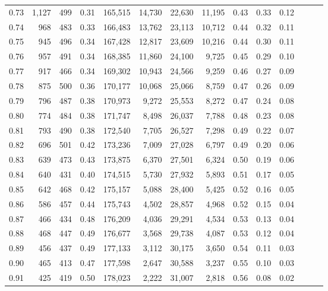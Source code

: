 \begin{tabular}{rrrrrrrrrrrrrr}
0.73 &  1,127 &  499 &  0.31 &  165,515 &   14,730 &  22,630 &  11,195 &  0.43 &  0.33 &      0.12 \\
0.74 &    968 &  483 &  0.33 &  166,483 &   13,762 &  23,113 &  10,712 &  0.44 &  0.32 &      0.11 \\
0.75 &    945 &  496 &  0.34 &  167,428 &   12,817 &  23,609 &  10,216 &  0.44 &  0.30 &      0.11 \\
0.76 &    957 &  491 &  0.34 &  168,385 &   11,860 &  24,100 &   9,725 &  0.45 &  0.29 &      0.10 \\
0.77 &    917 &  466 &  0.34 &  169,302 &   10,943 &  24,566 &   9,259 &  0.46 &  0.27 &      0.09 \\
0.78 &    875 &  500 &  0.36 &  170,177 &   10,068 &  25,066 &   8,759 &  0.47 &  0.26 &      0.09 \\
0.79 &    796 &  487 &  0.38 &  170,973 &    9,272 &  25,553 &   8,272 &  0.47 &  0.24 &      0.08 \\
0.80 &    774 &  484 &  0.38 &  171,747 &    8,498 &  26,037 &   7,788 &  0.48 &  0.23 &      0.08 \\
0.81 &    793 &  490 &  0.38 &  172,540 &    7,705 &  26,527 &   7,298 &  0.49 &  0.22 &      0.07 \\
0.82 &    696 &  501 &  0.42 &  173,236 &    7,009 &  27,028 &   6,797 &  0.49 &  0.20 &      0.06 \\
0.83 &    639 &  473 &  0.43 &  173,875 &    6,370 &  27,501 &   6,324 &  0.50 &  0.19 &      0.06 \\
0.84 &    640 &  431 &  0.40 &  174,515 &    5,730 &  27,932 &   5,893 &  0.51 &  0.17 &      0.05 \\
0.85 &    642 &  468 &  0.42 &  175,157 &    5,088 &  28,400 &   5,425 &  0.52 &  0.16 &      0.05 \\
0.86 &    586 &  457 &  0.44 &  175,743 &    4,502 &  28,857 &   4,968 &  0.52 &  0.15 &      0.04 \\
0.87 &    466 &  434 &  0.48 &  176,209 &    4,036 &  29,291 &   4,534 &  0.53 &  0.13 &      0.04 \\
0.88 &    468 &  447 &  0.49 &  176,677 &    3,568 &  29,738 &   4,087 &  0.53 &  0.12 &      0.04 \\
0.89 &    456 &  437 &  0.49 &  177,133 &    3,112 &  30,175 &   3,650 &  0.54 &  0.11 &      0.03 \\
0.90 &    465 &  413 &  0.47 &  177,598 &    2,647 &  30,588 &   3,237 &  0.55 &  0.10 &      0.03 \\
0.91 &    425 &  419 &  0.50 &  178,023 &    2,222 &  31,007 &   2,818 &  0.56 &  0.08 &      0.02 \\

\end{tabular}
